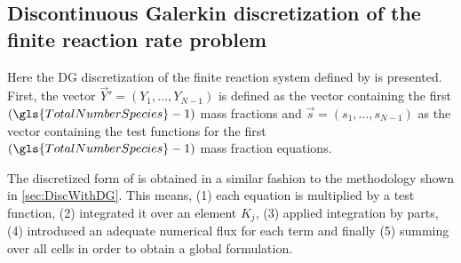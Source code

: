 \subsection{Discontinuous Galerkin discretization of the finite reaction rate problem}
Here the DG discretization of the finite reaction system defined by  is presented. 
First, the vector $\vec{Y}' = \left(Y_1,\dots,Y_{N-1}\right)$ is defined as the vector containing the first $(\gls{TotalNumberSpecies}-1)$ mass fractions and $\vec{s} = \left(s_1, \dots, s_{N-1} \right)$ as the vector containing the test functions for the first $(\gls{TotalNumberSpecies}-1)$  mass fraction equations. 

The discretized form of  is obtained in a similar fashion to the methodology shown in \cref{sec:DiscWithDG}. This means, (1) each equation is multiplied by a test function, (2) integrated it over an element $K_j$, (3) applied integration by parts, (4) introduced an adequate numerical flux for each term and finally (5) summing over all cells in order to obtain a global formulation.

